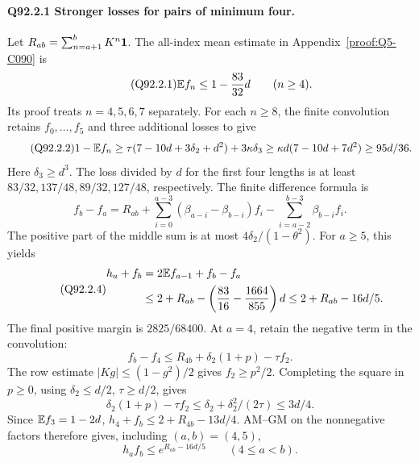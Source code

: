 \paragraph{Q92.2.1 Stronger losses for pairs of minimum four.}
Let \(R_{ab}=\allowbreak \sum_{n=\allowbreak a+1}^bK^n\mathbf1\). The all-index mean estimate in
Appendix~\ref{proof:Q5-C090} is
\begin{equation}\tag{Q92.2.1}\label{eq:Q92:2.1}
\mathbb E f_n\le1-\frac{83}{32}d\qquad(n\ge4).
\end{equation}
Its proof treats \(n=\allowbreak 4,\allowbreak 5,\allowbreak 6,\allowbreak 7\) separately. For each \(n\ge\allowbreak 8\), the finite
convolution retains \(f_0,\allowbreak \ldots,\allowbreak f_5\) and three additional losses to give
\begin{equation}\tag{Q92.2.2}\label{eq:Q92:2.2}
1-\mathbb E f_n\ge\tau(7-10d+3\delta_2+d^2)+3\kappa\delta_3
\ge\kappa d(7-10d+7d^2)\ge95d/36.
\end{equation}
Here \(\delta_3\ge\allowbreak  d^3\). The loss divided by \(d\) for the first four
lengths is at least \(83/32,\allowbreak 137/48,\allowbreak 89/32,\allowbreak 127/48\), respectively.
The finite difference formula is
\begin{equation}\tag{Q92.2.3}\label{eq:Q92:2.3}
f_b-f_a=R_{ab}
+\sum_{i=0}^{a-3}(\beta_{a-i}-\beta_{b-i})f_i
-\sum_{i=a-2}^{b-3}\beta_{b-i}f_i.
\end{equation}
The positive part of the middle sum is at most \(4\delta_2/(1-\theta^2)\).
For \(a\ge\allowbreak 5\), this yields
\begin{equation}\tag{Q92.2.4}\label{eq:Q92:2.4}
\begin{aligned}
h_a+f_b&=2\mathbb E f_{a-1}+f_b-f_a\\
&\le2+R_{ab}-\left(\frac{83}{16}-\frac{1664}{855}\right)d
\le2+R_{ab}-16d/5.
\end{aligned}
\end{equation}
The final positive margin is \(2825/68400\). At \(a=\allowbreak 4\), retain the
negative term in the convolution:
\begin{equation}\tag{Q92.2.5}\label{eq:Q92:2.5}
f_b-f_4\le R_{4b}+\delta_2(1+p)-\tau f_2.
\end{equation}
The row estimate \(|Kg|\le\allowbreak (1-g^2)/2\) gives \(f_2\ge\allowbreak  p^2/2\).
Completing the square in \(p\ge\allowbreak 0\), using
\(\delta_2\le\allowbreak  d/2\), \(\tau\ge\allowbreak  d/2\), gives
\begin{equation}\tag{Q92.2.6}\label{eq:Q92:2.6}
\delta_2(1+p)-\tau f_2
\le\delta_2+\delta_2^2/(2\tau)\le3d/4.
\end{equation}
Since \(\mathbb E f_3=\allowbreak 1-2d\), \(h_4+f_b\le\allowbreak 2+R_{4b}-13d/4\).
AM--GM on the nonnegative factors therefore gives, including \((a,\allowbreak b)=\allowbreak (4,\allowbreak 5)\),
\begin{equation}\tag{Q92.2.7}\label{eq:Q92:2.7}
\boxed{h_af_b\le e^{R_{ab}-16d/5}\qquad(4\le a<b).}
\end{equation}

